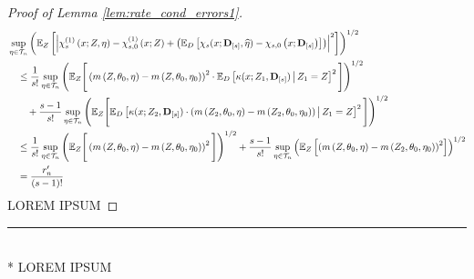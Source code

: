 \begin{proof}[Proof of Lemma \ref{lem:rate_cond_errors1}]
    \begin{equation}
        \begin{aligned}
            & \sup_{\eta \in \mathcal{T}_{n}}\left(
                \mathbb{E}_{Z}\left[
                    \left|\chi_{s}^{(1)}\left(x; Z, \eta\right) 
                    - \chi_{s,0}^{(1)}\left(x; Z\right)
                    + \left(\mathbb{E}_{D}\left[\chi_{s}(x; \mathbf{D}_{[s]}, \widehat{\eta}) - \chi_{s,0}\left(x; \mathbf{D}_{[s]}\right)\right]\right)\right|^2
                \right]
            \right)^{1 / 2} \\
            & \quad \leq
             \frac{1}{s!}\sup_{\eta \in \mathcal{T}_{n}}\left(\mathbb{E}_{Z}\Bigg[\left(m\left(Z, \theta_{0}, \eta\right) - m\left(Z, \theta_{0}, \eta_{0}\right)\right)^{2} \cdot \mathbb{E}_{D}\left[\kappa(x; Z_{1}, \mathbf{D}_{[s]}) \, \middle| \, Z_1 = Z \right]^{2}\Bigg]\right)^{1/2}\\
            & \quad \quad + \frac{s-1}{s!} \sup_{\eta \in \mathcal{T}_{n}} \left(\mathbb{E}_{Z}\Bigg[\mathbb{E}_{D}\left[\kappa(x; Z_{2}, \mathbf{D}_{[s]})\cdot \left(m\left(Z_{2}, \theta_{0}, \eta\right)
            - m\left(Z_{2}, \theta_{0}, \eta_{0}\right)\right) \, \middle| \, Z_1 = Z \right]^{2}\Bigg]\right)^{1/2} \\
            & \quad \leq 
            \frac{1}{s!}\sup_{\eta \in \mathcal{T}_{n}}\left(\mathbb{E}_{Z}\Bigg[\left(m\left(Z, \theta_{0}, \eta\right) - m\left(Z, \theta_{0}, \eta_{0}\right)\right)^{2} \Bigg]\right)^{1/2}
            + \frac{s-1}{s!} \sup_{\eta \in \mathcal{T}_{n}} \left(\mathbb{E}_{Z}\left[\left(m\left(Z, \theta_{0}, \eta\right)
            - m\left(Z_{2}, \theta_{0}, \eta_{0}\right)\right)^{2}\right]\right)^{1/2}\\
            & \quad = \frac{r_{n}^{\prime}}{(s-1)!}
        \end{aligned}
    \end{equation}
    {\color{red} LOREM IPSUM}
\end{proof}

\hrule

\begin{boxD}
    \begin{lem}[]\label{lem:rate_cond_errors2}\mbox{}\\*
    {\color{red} LOREM IPSUM}
\end{lem}    
\end{boxD}

